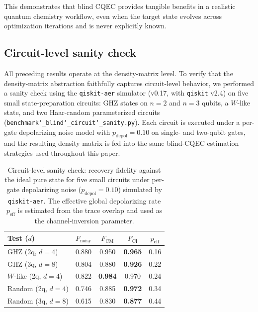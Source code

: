 \documentclass[prx,twocolumn,superscriptaddress,longbibliography,floatfix]{revtex4-2}
\begin{document}
This demonstrates that blind CQEC provides tangible benefits in a realistic quantum chemistry workflow, even when the target state evolves across optimization iterations and is never explicitly known.


\subsection{Circuit-level sanity check}
\label{sec:circuit_sanity}

All preceding results operate at the density-matrix level.
To verify that the density-matrix abstraction faithfully captures circuit-level behavior, we performed a sanity check using the \texttt{qiskit-aer} simulator (v0.17, with \texttt{qiskit} v2.4) on five small state-preparation circuits: GHZ states on $n = 2$ and $n = 3$ qubits, a $W$-like state, and two Haar-random parameterized circuits (\texttt{benchmark\char`\_blind\char`\_circuit\char`\_sanity.py}).
Each circuit is executed under a per-gate depolarizing noise model with $p_\mathrm{depol} = 0.10$ on single- and two-qubit gates, and the resulting density matrix is fed into the same blind-CQEC estimation strategies used throughout this paper.

\begin{table}[!tb]
\caption{Circuit-level sanity check: recovery fidelity against the ideal pure state for five small circuits under per-gate depolarizing noise ($p_\mathrm{depol} = 0.10$) simulated by \texttt{qiskit-aer}.
The effective global depolarizing rate $p_\mathrm{eff}$ is estimated from the trace overlap and used as the channel-inversion parameter.}
\label{tab:circuit_sanity}
\begin{ruledtabular}
\begin{tabular}{lcccc}
Test ($d$) & $F_\mathrm{noisy}$ & $F_\mathrm{CM}$ & $F_\mathrm{CI}$ & $p_\mathrm{eff}$ \\
\hline
GHZ (2q, $d{=}4$)        & 0.880 & 0.950 & \textbf{0.965} & 0.16 \\
GHZ (3q, $d{=}8$)        & 0.804 & 0.880 & \textbf{0.926} & 0.22 \\
$W$-like (2q, $d{=}4$)   & 0.822 & \textbf{0.984} & 0.970 & 0.24 \\
Random (2q, $d{=}4$)     & 0.746 & 0.885 & \textbf{0.972} & 0.34 \\
Random (3q, $d{=}8$)     & 0.615 & 0.830 & \textbf{0.877} & 0.44 \\
\end{tabular}
\end{ruledtabular}
\end{table}
\end{document}
